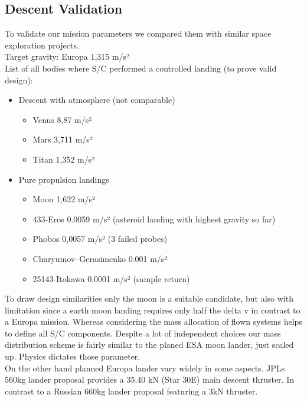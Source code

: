 \subsection{Descent Validation}
To validate our mission parameters we compared them with similar space exploration projects.\\
Target gravity: Europa 1,315 m/s²\\
List of all bodies where S/C performed a controlled landing (to prove valid design):
\begin{itemize}
\item Descent with atmosphere (not comparable)
\begin{itemize}  
\item Venus 8,87 m/s²
\item Mars 3,711 m/s²
\item Titan 1,352 m/s²
\end{itemize}

\item Pure propulsion landings
\begin{itemize}
\item Moon 1,622 m/s²
\item 433-Eros 0.0059 m/s² (asteroid landing with highest gravity so far)
\item Phobos 0,0057 m/s² (3 failed probes)
\item Churyumov–Gerasimenko 0.001 m/s²
\item 25143-Itokawa 0.0001 m/s² (sample return)
\end{itemize}
\end{itemize}

To draw design similarities only the moon is a suitable candidate, but also with limitation since a earth moon landing requires only half the delta v in contrast to a Europa mission. Whereas considering the mass allocation of flown systems helps to define all S/C components. Despite a lot of independent choices our mass distribution scheme is fairly similar to the planed ESA moon lander, just scaled up. Physics dictates those parameter.\\
On the other hand planned Europa lander vary widely in some aspects. JPLs \cite{JPLEuropaRep} 560kg lander proposal provides a 35.40 kN (Star 30E) main descent thruster. In contrast to a Russian \cite{AnatolyZakEurop} 660kg lander proposal featuring a 3kN thruster.


